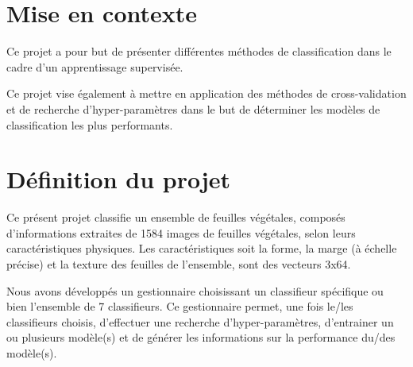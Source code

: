 \section{Mise en contexte}
Ce projet a pour but de présenter différentes méthodes de classification dans le cadre d'un apprentissage supervisée. 

Ce projet vise également à mettre en application des méthodes de cross-validation et de recherche d'hyper-paramètres dans le but de déterminer les modèles de classification les plus performants. 
\section{Définition du projet}
Ce présent projet classifie un ensemble de feuilles végétales, composés d'informations extraites de 1584 images de feuilles végétales, selon leurs caractéristiques physiques. Les caractéristiques soit la forme, la marge (à échelle précise) et la texture des feuilles de l'ensemble, sont des vecteurs 3x64.

Nous avons développés un gestionnaire choisissant un classifieur spécifique ou bien l'ensemble de 7 classifieurs. Ce gestionnaire permet, une fois le/les classifieurs choisis, d'effectuer une recherche d'hyper-paramètres, d'entrainer un ou plusieurs modèle(s) et de générer les informations sur la performance du/des modèle(s). 
\label{sec:definition_projet}